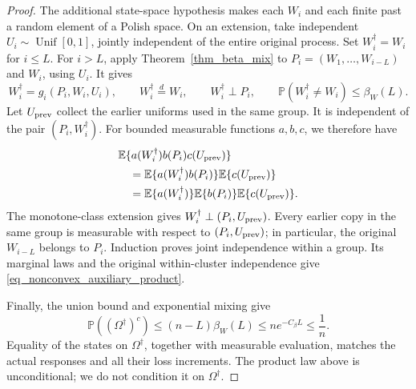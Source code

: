 \documentclass[twoside,11pt]{article}
\newenvironment{revision}{\color{revisionred}}{}
\begin{document}
\begin{revision}
\begin{proof}
The additional state-space hypothesis makes each $W_i$ and each
finite past a random element of a Polish space.
On an extension, take independent $U_i\sim\operatorname{Unif}[0,1]$,
jointly independent of the entire original process.
Set $W_i^\dagger=W_i$ for $i\leq L$.
For $i>L$, apply Theorem~\ref{thm_beta_mix} to
$P_i=(W_1,\ldots,W_{i-L})$ and $W_i$, using $U_i$. It gives
\[
W_i^\dagger=g_i(P_i,W_i,U_i),\qquad
W_i^\dagger\stackrel d=W_i,\qquad
W_i^\dagger\perp P_i,\qquad
\mathbb P(W_i^\dagger\ne W_i)\leq\beta_W(L).
\]
Let $U_{\rm prev}$ collect the earlier uniforms used in the same
group. It is independent of the pair $(P_i,W_i^\dagger)$.
For bounded measurable functions $a,b,c$, we therefore have
\begin{align*}
&\mathbb E\{a(W_i^\dagger)b(P_i)c(U_{\rm prev})\}\\
&\quad=\mathbb E\{a(W_i^\dagger)b(P_i)\}
                 \mathbb E\{c(U_{\rm prev})\}\\
&\quad=\mathbb E\{a(W_i^\dagger)\}
        \mathbb E\{b(P_i)\}\mathbb E\{c(U_{\rm prev})\}.
\end{align*}
The monotone-class extension gives
$W_i^\dagger\perp(P_i,U_{\rm prev})$.
Every earlier copy in the same group is measurable with respect
to $(P_i,U_{\rm prev})$; in particular, the original $W_{i-L}$
belongs to $P_i$. Induction proves joint independence within a
group. Its marginal laws and the original within-cluster
independence give \eqref{eq_nonconvex_auxiliary_product}.

Finally, the union bound and exponential mixing give
\[
\mathbb P((\Omega^\dagger)^c)
\leq(n-L)\beta_W(L)
\leq n e^{-C_\beta L}\leq\frac1n.
\]
Equality of the states on $\Omega^\dagger$, together with
measurable evaluation, matches the actual responses and all
their loss increments. The product law above is unconditional;
we do not condition it on $\Omega^\dagger$.
\end{proof}
\end{revision}
\end{document}
